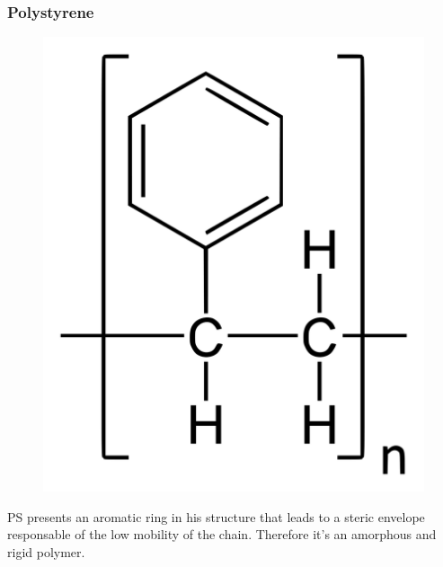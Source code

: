 \documentclass[a4paper, 11pt]{article}
\begin{document}
\newpage

\subsubsection{Polystyrene}

\begin{figure}[htp]
	\centering
	{\includegraphics[scale=0.16]{ps_chem}}
	\captionsetup{justification=centering}
	\label{fig:PE}
\end{figure}
PS presents an aromatic ring in his structure that leads to a steric envelope responsable of the low mobility of the chain. Therefore it's an amorphous and rigid polymer.
\end{document}
